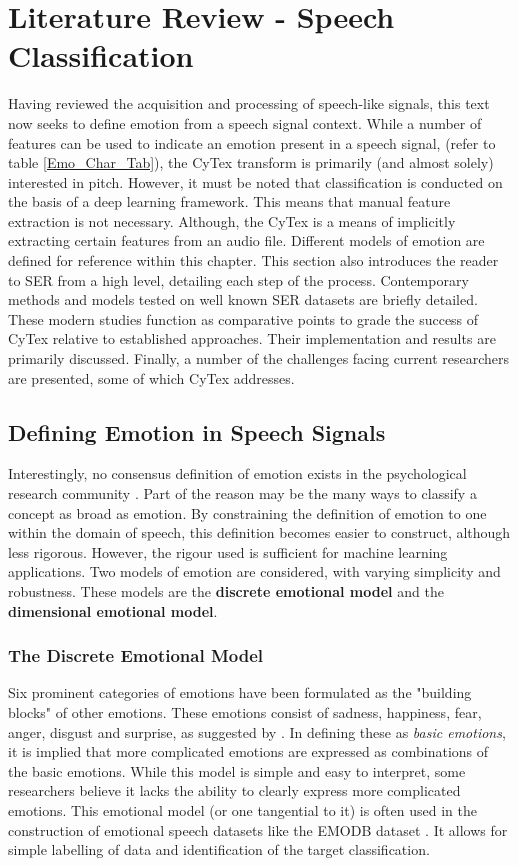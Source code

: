 \chapter{Literature Review - Speech Classification}\label{ch-lit-rev}
Having reviewed the acquisition and processing of speech-like signals, this text now seeks to define emotion from a speech signal context. While a number of features can be used to indicate an emotion present in a speech signal, (refer to table \ref{Emo_Char_Tab}), the CyTex transform is primarily (and almost solely) interested in pitch. However, it must be noted that classification is conducted on the basis of a deep learning framework. This means that manual feature extraction is not necessary. Although, the CyTex is a means of implicitly extracting certain features from an audio file. Different models of emotion are defined for reference within this chapter. This section also introduces the reader to SER from a high level, detailing each step of the process. Contemporary methods and models tested on well known SER datasets are briefly detailed. These modern studies function as comparative points to grade the success of CyTex relative to established approaches. Their implementation and results are primarily discussed. Finally, a number of the challenges facing current researchers are presented, some of which CyTex addresses.


\section{Defining Emotion in Speech Signals}
Interestingly, no consensus definition of emotion exists in the psychological research community \cite{surveyCORE1}. Part of the reason may be the many ways to classify a concept as broad as emotion. By constraining the definition of emotion to one within the domain of speech, this definition becomes easier to construct, although less rigorous. However, the rigour used is sufficient for machine learning applications. Two models of emotion are considered, with varying simplicity and robustness. These models are the \textbf{discrete emotional model} and the \textbf{dimensional emotional model}.
\subsection{The Discrete Emotional Model}
Six prominent categories of emotions have been formulated as the "building blocks" of other emotions. These emotions consist of sadness, happiness, fear, anger, disgust and surprise, as suggested by \cite{ekman2013emotion}. In defining these as \textit{basic emotions}, it is implied that more complicated emotions are expressed as combinations of the basic emotions. While this model is simple and easy to interpret, some researchers believe it lacks the ability to clearly express more complicated emotions. This emotional model (or one tangential to it) is often used in the construction of emotional speech datasets like the EMODB dataset \cite{EMODB_97}. It allows for simple labelling of data and identification of the target classification. 

